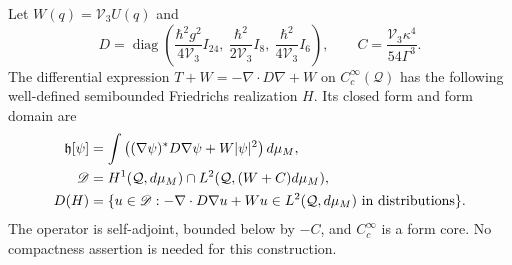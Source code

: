 \begin{theorem}
\label{qh:hq-Friedrichs}
Let \(W(q)=\mathcal V_3U(q)\) and
\[
 D=\operatorname{diag}\left(
   \frac{\hbar^2g^2}{4\mathcal V_3}I_{24},\
   \frac{\hbar^2}{2\mathcal V_3}I_8,\
   \frac{\hbar^2}{4\mathcal V_3}I_6\right),\qquad
 C=\frac{\mathcal V_3\kappa^4}{54\Gamma^3}.
\]
The differential expression \(T+W=-\nabla\cdot D\nabla+W\) on
\(C_c^\infty(\mathcal Q)\) has the following well-defined semibounded
Friedrichs realization \(H\). Its closed form and form domain are
\begin{align}
 \mathfrak h[\psi]&=\int\left((\nabla\psi)^*D\nabla\psi
                         +W|\psi|^2\right)d\mu_M,\notag\\
 \mathscr D&=H^1(\mathcal Q,d\mu_M)
                \cap L^2(\mathcal Q,(W+C)d\mu_M),\label{qh:hq-form}\\
 D(H)&=\{u\in\mathscr D:
          -\nabla\cdot D\nabla u+Wu\in L^2(\mathcal Q,d\mu_M)
                         \text{ in distributions}\}.\notag
\end{align}
The operator is self-adjoint, bounded below by \(-C\), and
\(C_c^\infty\) is a form core. No compactness assertion is needed
for this construction.
\end{theorem}
